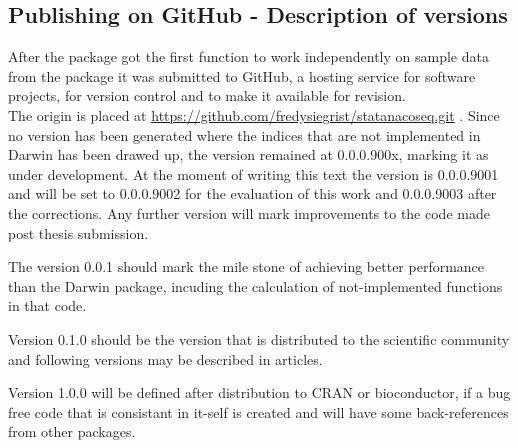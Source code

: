 \subsection{Publishing on GitHub - Description of versions}
After the package got the first function to work independently on sample data from the package it was submitted to GitHub, a hosting service for software projects, for version control and to make it available for revision. \\
The origin is placed at \href{https://github.com/fredysiegrist/statanacoseq.git}{https://github.com/fredysiegrist/statanacoseq.git} \cite{Charles2013}. Since no version has been generated where the indices that are not implemented in Darwin has been drawed up, the version remained at 0.0.0.900x, marking it as under development. At the moment of writing this text the version is 0.0.0.9001 and will be set to 0.0.0.9002 for the evaluation of this work and 0.0.0.9003 after the corrections. Any further version will mark improvements to the code made post thesis submission.

The version 0.0.1 should mark the mile stone of achieving better performance than the Darwin package, incuding the calculation of not-implemented functions in that code.

Version 0.1.0 should be the version that is distributed to the scientific community and following versions may be described in articles.

Version 1.0.0 will be defined after distribution to CRAN or bioconductor, if a bug free code that is consistant in it-self is created and will have some back-references from other packages.